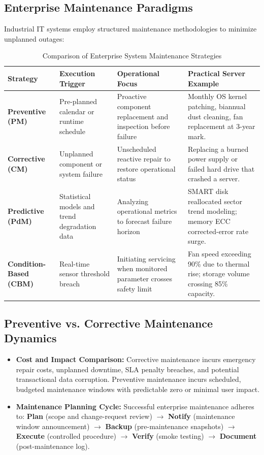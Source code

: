 \subsection{Enterprise Maintenance Paradigms}
Industrial IT systems employ structured maintenance methodologies to minimize unplanned outages:
\begin{table}[htbp]
\centering
\small
\caption{Comparison of Enterprise System Maintenance Strategies}
\label{tab:maintenance_strategies}
\begin{tabularx}{\textwidth}{l p{2.8cm} p{4cm} X}
\toprule
\textbf{Strategy} & \textbf{Execution Trigger} & \textbf{Operational Focus} & \textbf{Practical Server Example} \\
\midrule
\textbf{Preventive (PM)} & Pre-planned calendar or runtime schedule & Proactive component replacement and inspection before failure & Monthly OS kernel patching, biannual dust cleaning, fan replacement at 3-year mark. \\
\textbf{Corrective (CM)} & Unplanned component or system failure & Unscheduled reactive repair to restore operational status & Replacing a burned power supply or failed hard drive that crashed a server. \\
\textbf{Predictive (PdM)} & Statistical models and trend degradation data & Analyzing operational metrics to forecast failure horizon & SMART disk reallocated sector trend modeling; memory ECC corrected-error rate surge. \\
\textbf{Condition-Based (CBM)} & Real-time sensor threshold breach & Initiating servicing when monitored parameter crosses safety limit & Fan speed exceeding 90\% due to thermal rise; storage volume crossing 85\% capacity. \\
\bottomrule
\end{tabularx}
\end{table}

\subsection{Preventive vs. Corrective Maintenance Dynamics}
\begin{itemize}
    \item \textbf{Cost and Impact Comparison:} Corrective maintenance incurs emergency repair costs, unplanned downtime, SLA penalty breaches, and potential transactional data corruption. Preventive maintenance incurs scheduled, budgeted maintenance windows with predictable zero or minimal user impact.
    \item \textbf{Maintenance Planning Cycle:} Successful enterprise maintenance adheres to: \textbf{Plan} (scope and change-request review) $\to$ \textbf{Notify} (maintenance window announcement) $\to$ \textbf{Backup} (pre-maintenance snapshots) $\to$ \textbf{Execute} (controlled procedure) $\to$ \textbf{Verify} (smoke testing) $\to$ \textbf{Document} (post-maintenance log).
\end{itemize}

